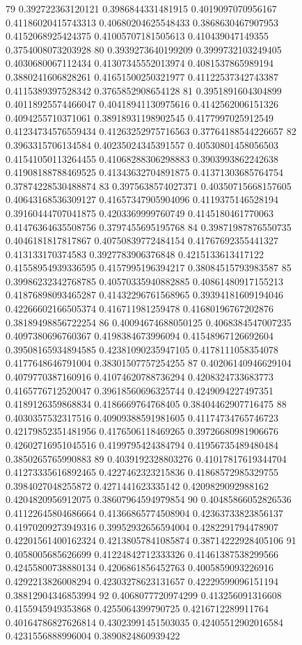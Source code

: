 79 0.392722363120121 0.3986844331481915 0.4019097070956167 0.41186020415743313 0.40680204625548433 0.3868630467907953 0.4152068925424375 0.41005707181505613 0.410439047149355 0.3754008073203928
80 0.3939273640199209 0.3999732103249405 0.4030680067112434 0.41307345552013974 0.4081537865989194 0.3880241606828261 0.41651500250321977 0.41122537342743387 0.4115389397528342 0.3765852908654128
81 0.3951891604304899 0.40118925574466047 0.40418941130975616 0.4142562006151326 0.4094255710371061 0.38918931198902545 0.4177997025912549 0.41234734576559434 0.41263252975716563 0.37764188544226657
82 0.3963315706134584 0.40235024345391557 0.40530801458056503 0.41541050113264455 0.41068288306298883 0.3903993862242638 0.41908188788469525 0.41343632704891875 0.41371303685764754 0.37874228530488874
83 0.3975638574027371 0.40350715668157605 0.40643168536309127 0.41657347905904096 0.4119375146528194 0.39160444707041875 0.4203369999760749 0.4145180461770063 0.41476364635508756 0.3797455695195768
84 0.39871987876550735 0.4046181817817867 0.40750839772484154 0.41767692355441327 0.413133170374583 0.3927783906376848 0.4215133613417122 0.41558954939336595 0.4157995196394217 0.38084515793983587
85 0.39986232342768785 0.40570335940882885 0.40861480917155213 0.41876898093465287 0.41432296761568965 0.39394181609194046 0.42266602166505374 0.416711981259478 0.41680196767202876 0.38189498856722254
86 0.40094674688050125 0.4068384547007235 0.4097380696760367 0.4198384673996094 0.41548967126692604 0.39508165934894585 0.42381090235947105 0.4178111058354078 0.4177648646791004 0.38301507757254255
87 0.40206140946629104 0.4079770387160916 0.41074620788736294 0.4208324733683773 0.4165776712520047 0.39618560696325744 0.4249094227497351 0.4189126359868834 0.4186669764768405 0.38404462907716475
88 0.4030357532317516 0.40909388591981605 0.41174734765746723 0.42179852351481956 0.4176506118469265 0.39726680981906676 0.42602716951045516 0.4199795424384794 0.41956735489480484 0.3850265765990883
89 0.4039192328803276 0.41017817619344704 0.41273335616892465 0.4227462323215836 0.41868572985329755 0.3984027048255872 0.4271441623335142 0.4209829092988162 0.4204820956912075 0.38607964594979854
90 0.40485866052826536 0.41122645804686664 0.41366865774508904 0.42363733823856137 0.41970209273949316 0.39952932656594004 0.4282291794478907 0.42201561400162324 0.42138057841085874 0.38714222928405106
91 0.4058005685626699 0.41224842712333326 0.41461387538299566 0.42455800738880134 0.4206861856452763 0.4005859093226916 0.4292213826008294 0.42303278623131657 0.42229599096151194 0.38812904346853994
92 0.4068077720974299 0.413256091316608 0.4155945949353868 0.4255064399790725 0.4216712289911764 0.40164786827626814 0.43023991451503035 0.42405512902016584 0.4231556888996004 0.3890824860939422
